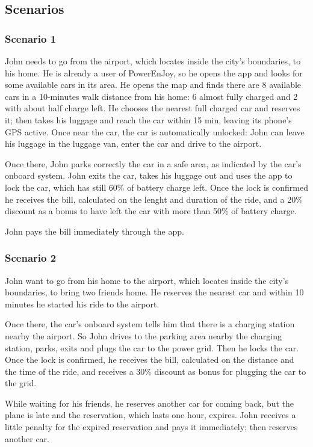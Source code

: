 \documentclass[11pt]{article} %
\newcommand{\pecomma}{PowerEnJoy, }
\begin{document}
\subsection{Scenarios}

\subsubsection{Scenario 1}
John needs to go from the airport, which locates inside the city's boundaries, to his home. He is already a user of \pecomma so he opens the app and looks for some available cars in its area. He opens the map and finds there are 8 available cars in a 10-minutes walk distance from his home: 6 almost fully charged and 2 with about half charge left. He chooses the nearest full charged car and reserves it; then takes his luggage and reach the car within 15 min, leaving its phone's GPS active. Once near the car, the car is automatically unlocked: John can leave his luggage in the luggage van, enter the car and drive to the airport.

Once there, John parks correctly the car in a safe area, as indicated by the car's onboard system. John exits the car, takes his luggage out and uses the app to lock the car, which has still 60\% of battery charge left. Once the lock is confirmed he receives the bill, calculated on the lenght and duration of the ride, and a 20\% discount as a bonus to have left the car with more than 50\% of battery charge.

John pays the bill immediately through the app.

\subsubsection{Scenario 2}
John want to go from his home to the airport, which locates inside the city's boundaries, to bring two friends home. He reserves the nearest car and within 10 minutes he started his ride to the airport.

Once there, the car's onboard system tells him that there is a charging station nearby the airport. So John drives to the parking area nearby the charging station, parks, exits and plugs the car to the power grid. Then he locks the car.
Once the lock is confirmed, he receives the bill, calculated on the distance and the time of the ride, and receives a 30\% discount as bonus for plugging the car to the grid.

While waiting for his friends, he reserves another car for coming back, but the plane is late and the reservation, which lasts one hour, expires. John receives a little penalty for the expired reservation and pays it immediately; then reserves another car.
\end{document}
